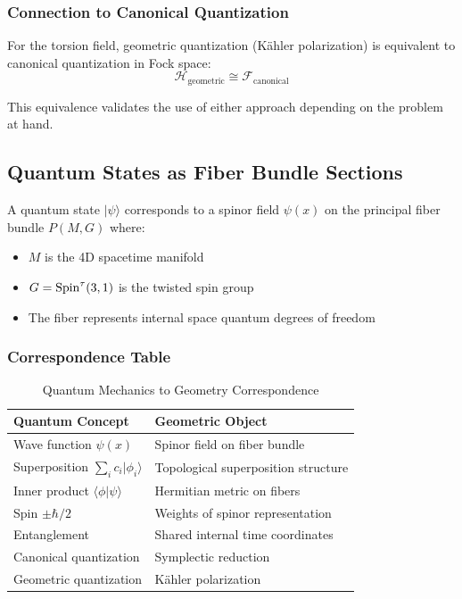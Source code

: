 \subsubsection{Connection to Canonical Quantization}

\begin{theorem}
For the torsion field, geometric quantization (Kähler polarization) is equivalent to canonical quantization in Fock space:
\begin{equation}
    \mathcal{H}_{\text{geometric}} \cong \mathcal{F}_{\text{canonical}}
\end{equation}
\end{theorem}

This equivalence validates the use of either approach depending on the problem at hand.

\subsection{Quantum States as Fiber Bundle Sections}

\begin{definition}
A quantum state $|\psi\rangle$ corresponds to a spinor field $\psi(x)$ on the principal fiber bundle $P(M, G)$ where:
\begin{itemize}
    \item $M$ is the 4D spacetime manifold
    \item $G = \mathrm{Spin}^\tau(3,1)$ is the twisted spin group
    \item The fiber represents internal space quantum degrees of freedom
\end{itemize}
\end{definition}

\subsubsection{Correspondence Table}

\begin{table}[htbp]
\centering
\caption{Quantum Mechanics to Geometry Correspondence}
\begin{tabular}{ll}
\hline
\textbf{Quantum Concept} & \textbf{Geometric Object} \\
\hline
Wave function $\psi(x)$ & Spinor field on fiber bundle \\
Superposition $\sum_i c_i |\phi_i\rangle$ & Topological superposition structure \\
Inner product $\langle\phi|\psi\rangle$ & Hermitian metric on fibers \\
Spin $\pm\hbar/2$ & Weights of spinor representation \\
Entanglement & Shared internal time coordinates \\
Canonical quantization & Symplectic reduction \\
Geometric quantization & Kähler polarization \\
\hline
\end{tabular}
\end{table}

